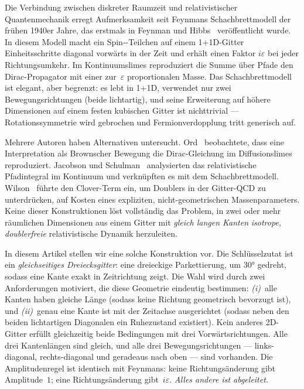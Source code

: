 \documentclass[twocolumn,showpacs,preprintnumbers,amsmath,amssymb]{revtex4-2}
\newcommand{\eps}{\varepsilon}
\begin{document}
Die Verbindung zwischen diskreter Raumzeit und relativistischer
Quantenmechanik erregt Aufmerksamkeit seit Feynmans Schachbrettmodell der
frühen 1940er Jahre, das erstmals in Feynman und Hibbs~\cite{feynman1965}
veröffentlicht wurde.
In diesem Modell macht ein Spin--Teilchen auf einem
\mbox{1\!+\!1D}-Gitter Einheitsschritte diagonal vorwärts in der Zeit und
erhält einen Faktor $i\eps$ bei jeder Richtungsumkehr.
Im Kontinuumslimes reproduziert die Summe über Pfade den Dirac-Propagator mit
einer zur~$\eps$ proportionalen Masse.
Das Schachbrettmodell ist elegant, aber begrenzt: es lebt in \mbox{1\!+\!1D},
verwendet nur zwei Bewegungsrichtungen (beide lichtartig), und seine
Erweiterung auf höhere Dimensionen auf einem festen kubischen Gitter ist
nichttrivial --- Rotationssymmetrie wird gebrochen und Fermionverdopplung
\cite{nielsen1981,susskind1977} tritt generisch auf.

Mehrere Autoren haben Alternativen untersucht.
Ord~\cite{ord1983} beobachtete, dass eine Interpretation als Brownscher
Bewegung die Dirac-Gleichung im Diffusionslimes reproduziert.
Jacobson und Schulman~\cite{jacobson1984} analysierten das relativistische
Pfadintegral im Kontinuum und verknüpften es mit dem Schachbrettmodell.
Wilson~\cite{wilson1974} führte den Clover-Term ein, um Doublers in der
Gitter-QCD zu unterdrücken, auf Kosten eines expliziten, nicht-geometrischen
Massenparameters.
Keine dieser Konstruktionen löst vollständig das Problem, in zwei oder mehr
räumlichen Dimensionen aus einem Gitter mit \emph{gleich langen Kanten}
\emph{isotrope, doublerfreie} relativistische Dynamik herzuleiten.

In diesem Artikel stellen wir eine solche Konstruktion vor.
Die Schlüsselzutat ist ein \emph{gleichseitiges Dreiecksgitter}: eine
dreieckige Parkettierung, um $30°$ gedreht, sodass eine Kante exakt in
Zeitrichtung zeigt.
Die Wahl wird durch zwei Anforderungen motiviert, die diese Geometrie
eindeutig bestimmen: \emph{(i)}~alle Kanten haben gleiche Länge (sodass
keine Richtung geometrisch bevorzugt ist), und \emph{(ii)}~genau eine
Kante ist mit der Zeitachse ausgerichtet (sodass neben den beiden lichtartigen
Diagonalen ein Ruhezustand existiert).
Kein anderes 2D-Gitter erfüllt gleichzeitig beide Bedingungen mit drei
Vorwärtsrichtungen.
Alle drei Kantenlängen sind gleich, und alle drei Bewegungsrichtungen ---
links-diagonal, rechts-diagonal und geradeaus nach oben --- sind vorhanden.
Die Amplitudenregel ist identisch mit Feynmans: keine Richtungsänderung gibt
Amplitude~$1$; eine Richtungsänderung gibt~$i\eps$.
\emph{Alles andere ist abgeleitet.}
\end{document}
